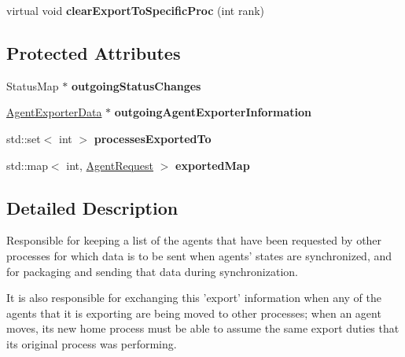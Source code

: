 \begin{DoxyCompactItemize}
\item 
\hypertarget{classrepast_1_1_abstract_exporter_adebe9add519210ab436c3fae09899cc7}{virtual void {\bfseries clear\-Export\-To\-Specific\-Proc} (int rank)}\label{classrepast_1_1_abstract_exporter_adebe9add519210ab436c3fae09899cc7}

\end{DoxyCompactItemize}
\subsection*{Protected Attributes}
\begin{DoxyCompactItemize}
\item 
\hypertarget{classrepast_1_1_abstract_exporter_ad116dd70f9517119e2d2712beb33adc8}{Status\-Map $\ast$ {\bfseries outgoing\-Status\-Changes}}\label{classrepast_1_1_abstract_exporter_ad116dd70f9517119e2d2712beb33adc8}

\item 
\hypertarget{classrepast_1_1_abstract_exporter_ab3da50572c1fcb852a8676f3deefbf1d}{\hyperlink{classrepast_1_1_agent_exporter_data}{Agent\-Exporter\-Data} $\ast$ {\bfseries outgoing\-Agent\-Exporter\-Information}}\label{classrepast_1_1_abstract_exporter_ab3da50572c1fcb852a8676f3deefbf1d}

\item 
\hypertarget{classrepast_1_1_abstract_exporter_ad61d9e8b964430e130c42d87aad7eab6}{std\-::set$<$ int $>$ {\bfseries processes\-Exported\-To}}\label{classrepast_1_1_abstract_exporter_ad61d9e8b964430e130c42d87aad7eab6}

\item 
\hypertarget{classrepast_1_1_abstract_exporter_aed412358d3bf2742c9445b9b999a81e4}{std\-::map$<$ int, \hyperlink{classrepast_1_1_agent_request}{Agent\-Request} $>$ {\bfseries exported\-Map}}\label{classrepast_1_1_abstract_exporter_aed412358d3bf2742c9445b9b999a81e4}

\end{DoxyCompactItemize}


\subsection{Detailed Description}
Responsible for keeping a list of the agents that have been requested by other processes for which data is to be sent when agents' states are synchronized, and for packaging and sending that data during synchronization. 

It is also responsible for exchanging this 'export' information when any of the agents that it is exporting are being moved to other processes; when an agent moves, its new home process must be able to assume the same export duties that its original process was performing. 

